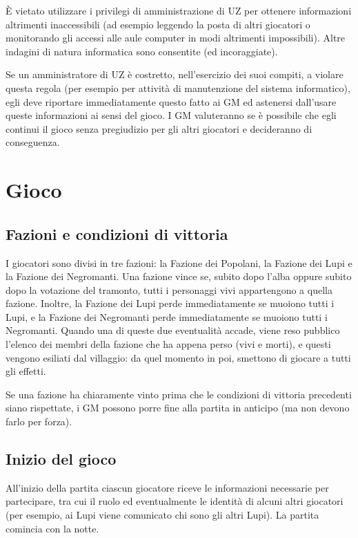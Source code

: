 \documentclass[a4paper,10pt]{article}
\begin{document}
È vietato utilizzare i privilegi di amministrazione di UZ per ottenere informazioni altrimenti inaccessibili (ad esempio leggendo la posta di altri giocatori o monitorando gli accessi alle aule computer in modi altrimenti impossibili). Altre indagini di natura informatica sono consentite (ed incoraggiate).

Se un amministratore di UZ è costretto, nell'esercizio dei suoi compiti, a violare questa regola (per esempio per attività di manutenzione del sistema informatico), egli deve riportare immediatamente questo fatto ai GM ed astenersi dall'usare queste informazioni ai sensi del gioco. I GM valuteranno se è possibile che egli continui il gioco senza pregiudizio per gli altri giocatori e decideranno di conseguenza.

\pagebreak

\section{Gioco}

\subsection{Fazioni e condizioni di vittoria}

I giocatori sono divisi in tre fazioni: la Fazione dei Popolani, la Fazione dei Lupi e la Fazione dei Negromanti. Una fazione vince se, subito dopo l'alba oppure subito dopo la votazione del tramonto, tutti i personaggi vivi appartengono a quella fazione. Inoltre, la Fazione dei Lupi perde immediatamente se muoiono tutti i Lupi, e la Fazione dei Negromanti perde immediatamente se muoiono tutti i Negromanti. Quando una di queste due eventualità accade, viene reso pubblico l'elenco dei membri della fazione che ha appena perso (vivi e morti), e questi vengono esiliati dal villaggio: da quel momento in poi, smettono di giocare a tutti gli effetti.

Se una fazione ha chiaramente vinto prima che le condizioni di vittoria precedenti siano rispettate, i GM possono porre fine alla partita in anticipo (ma non devono farlo per forza).

\subsection{Inizio del gioco}

All'inizio della partita ciascun giocatore riceve le informazioni necessarie per partecipare, tra cui il ruolo ed eventualmente le identità di alcuni altri giocatori (per esempio, ai Lupi viene comunicato chi sono gli altri Lupi). La partita comincia con la notte.
\end{document}
